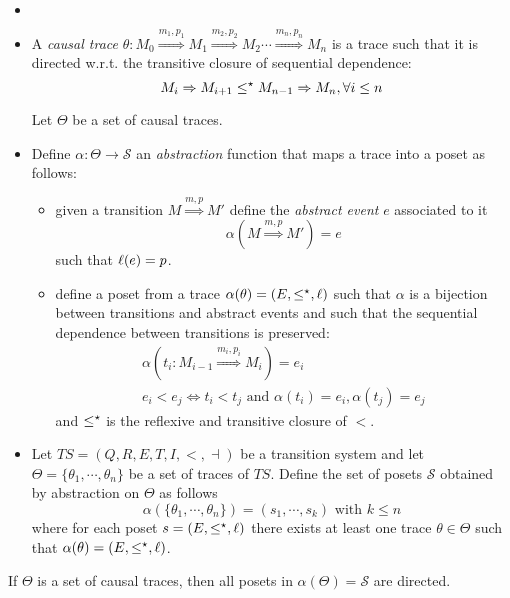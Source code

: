 \begin{definition}
  \label{def:abstraction}
  \begin{itemize}
  \item[] $~$
  \item A \emph{causal trace} $\theta:M_0\overset{m_1,p_1}{\Rightarrow} M_1\overset{m_2,p_2}{\Rightarrow} M_2 \cdots \overset{m_n,p_n}{\Rightarrow} M_n$ is a trace such that it is directed w.r.t. the transitive closure of sequential dependence:
    \[
    M_i \Rightarrow M_{i+1} \leq^{\star} M_{n-1}\Rightarrow M_n, \forall i\leq n
    \]

    Let $\Theta$ be a set of causal traces.
  \item Define $\alpha:\Theta\to\mathcal{S}$ an \emph{abstraction} function that maps a trace into a poset as follows:
    \begin{itemize}
    \item given a transition $M\overset{m,p}{\Rightarrow} M'$ define the \emph{abstract event} $e$ associated to it
      \[
      \alpha(M\overset{m,p}{\Rightarrow} M') = e
      \]
      such that $\ell(e) = p$.
    \item define a poset from a trace $\alpha(\theta) = (E,\leq^{\star},\ell)$ such that $\alpha$ is a bijection between transitions and abstract events and such that the sequential dependence between transitions is preserved:
      \begin{align*}
        \alpha(t_i:M_{i-1}\overset{m_{i},p_{i}}{\Rightarrow}M_i) = e_i \\
        e_i < e_j \iff t_i < t_j \text{ and } \alpha(t_i)=e_i, \alpha(t_j)=e_j
      \end{align*}
      and $\leq^{\star}$ is the reflexive and transitive closure of $<$.
  \end{itemize}
  \item
    Let $TS = (Q,R,E,T,I,<,\dashv)$ be a transition system and let $\Theta = \{\theta_1,\cdots,\theta_n\}$ be a set of traces of $TS$.
    Define the set of posets $\mathcal{S}$ obtained by abstraction on $\Theta$ as follows
    \[
    \alpha(\{\theta_1,\cdots,\theta_n\}) = (s_1,\cdots, s_k)\text{ with }k\leq n
    \]
    where for each poset $s = (E,\leq^{\star},\ell)$ there exists at least one trace $\theta\in\Theta$ such that $\alpha(\theta) = (E,\leq^{\star},\ell)$.
  \end{itemize}
\end{definition}

\begin{property}
  If $\Theta$ is a set of causal traces, then all posets in $\alpha(\Theta)=\mathcal{S}$ are directed.
\end{property}

